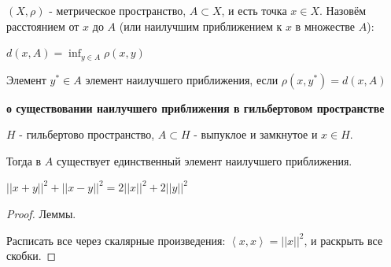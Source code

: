 \begin{definition}
    $(X, \rho)$ - метрическое пространство, $A \subset X$, и есть точка $x \in X$. Назовём расстоянием от $x$ до $A$ (или наилучшим приближением к $x$ в множестве $A$):

    $d(x, A) = \inf_{y \in A} \rho (x, y)$
\end{definition}

\begin{definition}
    Элемент $y^{*} \in A$ элемент наилучшего приближения, если $\rho (x, y^*) = d(x, A)$
\end{definition}

\begin{theorem}
    \textbf{о существовании наилучшего приближения в гильбертовом пространстве}

    $H$ - гильбертово пространство, $A \subset H$ - выпуклое и замкнутое и $x \in H$.

    Тогда в $A$ существует единственный элемент наилучшего приближения.
\end{theorem}

\begin{lemma}
    $||x + y||^2 + ||x - y||^2 = 2||x||^2 + 2||y||^2 $
\end{lemma}

\begin{proof} Леммы.


    Расписать все через скалярные произведения: $\left< x, x \right> = || x ||^2$, и раскрыть все скобки.
\end{proof}

